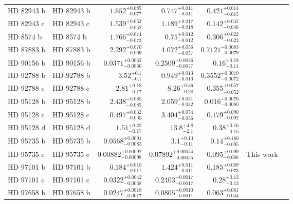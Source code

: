 \begin{longtable*}{llrrrrr}
HD 82943 b & HD 82943 b & $1.652^{+0.085}_{-0.077}$ & $0.747^{+0.011}_{-0.011}$ & $0.421^{+0.014}_{-0.015}$ & \cite{Mayor04} & \\ 
HD 82943 c & HD 82943 c & $1.539^{+0.053}_{-0.052}$ & $1.189^{+0.017}_{-0.018}$ & $0.142^{+0.042}_{-0.046}$ & \cite{Mayor04} & \\ 
HD 8574 b & HD 8574 b & $1.766^{+0.074}_{-0.073}$ & $0.75^{+0.012}_{-0.012}$ & $0.306^{+0.022}_{-0.022}$ & \cite{Perrier03} & \\ 
HD 87883 b & HD 87883 b & $2.292^{+0.070}_{-0.069}$ & $4.072^{+0.056}_{-0.057}$ & $0.7121^{+0.0083}_{-0.0079}$ & \cite{Fischer09} & \\ 
HD 90156 b & HD 90156 b & $0.0371^{+0.0062}_{-0.0060}$ & $0.2509^{+0.0036}_{-0.0037}$ & $0.16^{+0.18}_{-0.11}$ & \cite{Mordasini11} & \\ 
HD 92788 b & HD 92788 b & $3.52^{+0.1}_{-0.1}$ & $0.949^{+0.013}_{-0.013}$ & $0.3552^{+0.0070}_{-0.0072}$ & \cite{Fischer01} & \\ 
HD 92788 c & HD 92788 c & $2.81^{+0.18}_{-0.17}$ & $8.26^{+0.36}_{-0.28}$ & $0.355^{+0.057}_{-0.052}$ & \cite{Rickman19} & \\ 
HD 95128 b & HD 95128 b & $2.438^{+0.085}_{-0.085}$ & $2.059^{+0.031}_{-0.032}$ & $0.016^{+0.0076}_{-0.0080}$ & \cite{Naef04} & \\ 
HD 95128 c & HD 95128 c & $0.497^{+0.032}_{-0.030}$ & $3.404^{+0.054}_{-0.056}$ & $0.179^{+0.090}_{-0.092}$ & \cite{Wittenmyer07} & \\ 
HD 95128 d & HD 95128 d & $1.51^{+0.22}_{-0.17}$ & $13.8^{+4.8}_{-2.1}$ & $0.38^{+0.16}_{-0.15}$ & \cite{Gregory10} & \\ 
HD 95735 b & HD 95735 b & $0.0568^{+0.0091}_{-0.0083}$ & $3.1^{+0.13}_{-0.11}$ & $0.14^{+0.160}_{-0.095}$ & \cite{Diaz19} & \\ 
HD 95735 c & HD 95735 c & $0.00882^{+0.00092}_{-0.00098}$ & $0.07892^{+0.00054}_{-0.00055}$ & $0.095^{+0.099}_{-0.066}$ & This work & \\ 
HD 97101 b & HD 97101 b & $0.184^{+0.010}_{-0.011}$ & $1.424^{+0.011}_{-0.011}$ & $0.185^{+0.069}_{-0.073}$ & \cite{Dedrick et al. in prep} & \\ 
HD 97101 c & HD 97101 c & $0.0322^{+0.0042}_{-0.0038}$ & $0.2403^{+0.0017}_{-0.0017}$ & $0.28^{+0.13}_{-0.13}$ & \cite{Dedrick et al. in prep} & \\ 
HD 97658 b & HD 97658 b & $0.0247^{+0.0018}_{-0.0017}$ & $0.0805^{+0.0010}_{-0.0011}$ & $0.063^{+0.061}_{-0.044}$ & \cite{Howard11} & \\ 

\end{longtable*}
